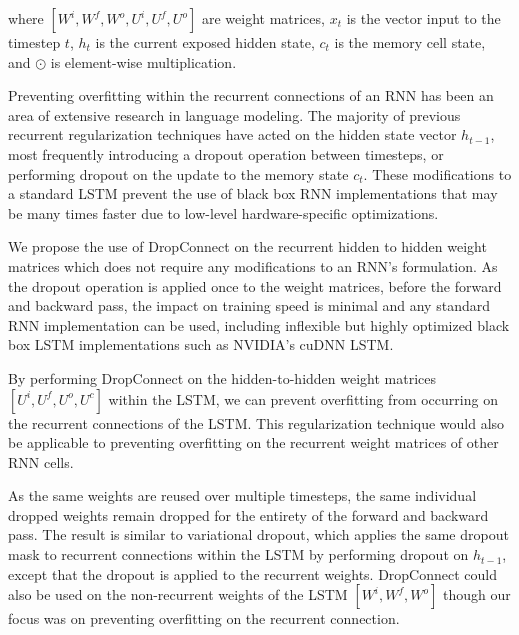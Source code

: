 \documentclass{article}
\begin{document}
where $[W^i, W^f, W^o, U^i, U^f, U^o]$ are weight matrices, $x_t$ is the vector input to the timestep $t$, $h_t$ is the current exposed hidden state, $c_t$ is the memory cell state, and $\odot$ is element-wise multiplication.

Preventing overfitting within the recurrent connections of an RNN has been an area of extensive research in language modeling.
The majority of previous recurrent regularization techniques have acted on the hidden state vector $h_{t-1}$, most frequently introducing a dropout operation between timesteps, or performing dropout on the update to the memory state $c_t$.
These modifications to a standard LSTM prevent the use of black box RNN implementations that may be many times faster due to low-level hardware-specific optimizations.

We propose the use of DropConnect \citep{dropconnect} on the recurrent hidden to hidden weight matrices which does not require any modifications to an RNN's formulation.
As the dropout operation is applied once to the weight matrices, before the forward and backward pass, the impact on training speed is minimal and any standard RNN implementation can be used, including inflexible but highly optimized black box LSTM implementations such as NVIDIA's cuDNN LSTM.

By performing DropConnect on the hidden-to-hidden weight matrices $[U^i, U^f, U^o, U^c]$ within the LSTM, we can prevent overfitting from occurring on the recurrent connections of the LSTM.
This regularization technique would also be applicable to preventing overfitting on the recurrent weight matrices of other RNN cells.

As the same weights are reused over multiple timesteps, the same individual dropped weights remain dropped for the entirety of the forward and backward pass.
The result is similar to variational dropout, which applies the same dropout mask to recurrent connections within the LSTM by performing dropout on $h_{t-1}$, except that the dropout is applied to the recurrent weights.
DropConnect could also be used on the non-recurrent weights of the LSTM $[W^i, W^f, W^o]$ though our focus was on preventing overfitting on the recurrent connection.
\end{document}
